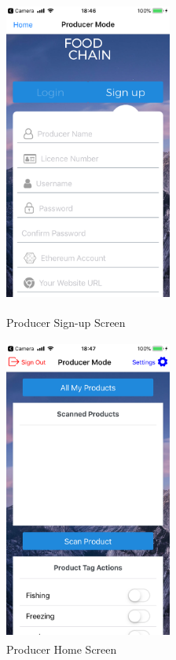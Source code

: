 \begin{figure}[!h]
	\centering
	\begin{minipage}[t]{4cm}
		\centering
		\includegraphics[width=5.5cm, height=10cm]{figures/app-5.PNG}
		\caption{Producer Sign-up Screen}
		\label{fig:app-sign-up-screen}
	\end{minipage}
	\hspace{3cm}
	\begin{minipage}[t]{4cm}
		\centering
		\includegraphics[width=5.5cm, height=10cm]{figures/app-6.PNG}
		\caption{Producer Home Screen}
		\label{fig:app-producer-home-screen}
	\end{minipage}
\end{figure}


